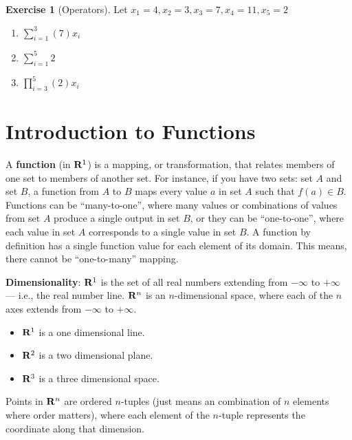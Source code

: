 \documentclass[
]{book}
\providecommand{\tightlist}{%
  \setlength{\itemsep}{0pt}\setlength{\parskip}{0pt}}
\theoremstyle{definition}
\theoremstyle{definition}
\theoremstyle{definition}
\newtheorem{exercise}{Exercise}[chapter]
\theoremstyle{remark}
\begin{document}
\begin{exercise}[Operators]
\protect\hypertarget{exr:operators1}{}{\label{exr:operators1} {} }Let \(x_1 = 4, x_2 = 3, x_3 = 7, x_4 = 11, x_5 = 2\)

\begin{enumerate}
\def\labelenumi{\arabic{enumi}.}
\item
  \(\sum\limits_{i=1}^{3} (7)x_i\)
\item
  \(\sum\limits_{i=1}^{5} 2\)
\item
  \(\prod\limits_{i=3}^{5} (2)x_i\)
\end{enumerate}
\end{exercise}

\hypertarget{introduction-to-functions}{%
\section{Introduction to Functions}\label{introduction-to-functions}}

A \textbf{function} (in \({\bf R}^1\)) is a mapping, or transformation, that relates members of one set to members of another set. For instance, if you have two sets: set \(A\) and set \(B\), a function from \(A\) to \(B\) maps every value \(a\) in set \(A\) such that \(f(a) \in B\). Functions can be ``many-to-one'', where many values or combinations of values from set \(A\) produce a single output in set \(B\), or they can be ``one-to-one'', where each value in set \(A\) corresponds to a single value in set \(B\). A function by definition has a single function value for each element of its domain. This means, there cannot be ``one-to-many'' mapping.

\textbf{Dimensionality}: \({\bf R}^1\) is the set of all real numbers extending from \(-\infty\) to \(+\infty\) --- i.e., the real number line. \({\bf R}^n\) is an \(n\)-dimensional space, where each of the \(n\) axes extends from \(-\infty\) to \(+\infty\).

\begin{itemize}
\tightlist
\item
  \({\bf R}^1\) is a one dimensional line.
\item
  \({\bf R}^2\) is a two dimensional plane.
\item
  \({\bf R}^3\) is a three dimensional space.
\end{itemize}

Points in \({\bf R}^n\) are ordered \(n\)-tuples (just means an combination of \(n\) elements where order matters), where each element of the \(n\)-tuple represents the coordinate along that dimension.
\end{document}
